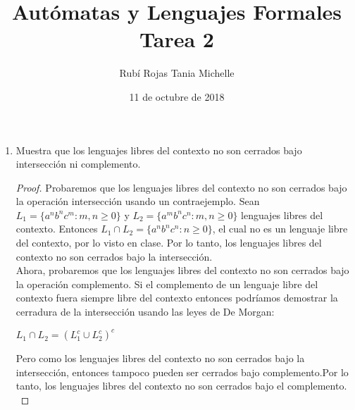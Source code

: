 \documentclass[letterpaper,11pt]{article}
\title{Autómatas y Lenguajes Formales\\ Tarea 2}
\author{Rubí Rojas Tania Michelle}
\date{11 de octubre de 2018}
\begin{document}
    \maketitle
    \begin{enumerate}
        \item Muestra que los lenguajes libres del contexto no son cerrados
        bajo intersección ni complemento.
        \begin{proof}
            Probaremos que los lenguajes libres del contexto no son cerrados 
            bajo la operación intersección usando un contraejemplo. Sean 
            $L_1 = \{a^{n}b^{n}c^{m} : m,n \geq 0\}$ y 
            $L_2 = \{a^{m}b^{n}c^{n} : m,n \geq 0\}$ lenguajes libres del 
            contexto. Entonces $L_1 \cap L_2 = \{a^{n}b^{n}c^{n} : n \geq 0\}$,
            el cual no es un lenguaje libre del contexto, por lo visto en
            clase. Por lo tanto, los lenguajes libres del contexto no son 
            cerrados bajo la intersección. \\
            Ahora, probaremos que los lenguajes libres del contexto no son 
            cerrados bajo la operación complemento. Si el complemento de un
            lenguaje libre del contexto fuera siempre libre del contexto
            entonces podríamos demostrar la cerradura de la intersección
            usando las leyes de De Morgan:
            \begin{center}
                $L_1 \cap L_2 = (L_1^{c} \cup L_2^{c})^{c}$
            \end{center}
            Pero como los lenguajes libres del contexto no son cerrados bajo
            la intersección, entonces tampoco pueden ser cerrados bajo 
            complemento.Por lo tanto, los lenguajes libres del contexto no son
            cerrados bajo el complemento.\\
        \end{proof}
        

\end{enumerate}
\end{document}

